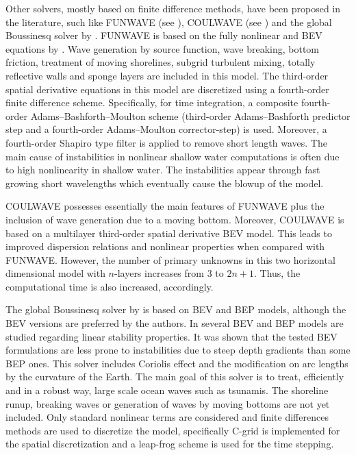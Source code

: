 Other solvers, mostly based on finite difference methods, have been
proposed in the literature, such like FUNWAVE (see \citet{Kirby1998}),
COULWAVE (see \citet{LynettLiu2004}) and the global Boussinesq solver
by \citet{PedersenLovholt2008}.  FUNWAVE is based on the fully
nonlinear and BEV equations by \citet{WeiKirby1995}.  Wave generation
by source function, wave breaking, bottom friction, treatment of
moving shorelines, subgrid turbulent mixing, totally reflective walls
and sponge layers are included in this model.  The third-order spatial
derivative equations in this model are discretized using a
fourth-order finite difference scheme.  Specifically, for time
integration, a composite fourth-order Adams--Bashforth--Moulton scheme
(third-order Adams--Bashforth predictor step and a fourth-order
Adams--Moulton corrector-step) is used.  Moreover, a fourth-order
Shapiro type filter is applied to remove short length waves.  The main
cause of instabilities in nonlinear shallow water computations is
often due to high nonlinearity in shallow water.  The instabilities
appear through fast growing short wavelengths which eventually cause
the blowup of the model.

COULWAVE possesses essentially the main features of FUNWAVE plus the
inclusion of wave generation due to a moving bottom.  Moreover,
COULWAVE is based on a multilayer third-order spatial derivative BEV
model.  This leads to improved dispersion relations and nonlinear
properties when compared with FUNWAVE.  However, the number of primary
unknowns in this two horizontal dimensional model with $n$-layers
increases from $3$ to $2n+1$. Thus, the computational time is also
increased, accordingly.

The global Boussinesq solver by \citet{PedersenLovholt2008} is based
on BEV and BEP models, although the BEV versions are preferred by the
authors.  In \citet{LovholtPedersen2009} several BEV and BEP models
are studied regarding linear stability properties.  It was shown that
the tested BEV formulations are less prone to instabilities due to
steep depth gradients than some BEP ones.  This solver includes
Coriolis effect and the modification on arc lengths by the curvature
of the Earth. The main goal of this solver is to treat, efficiently
and in a robust way, large scale ocean waves such as tsunamis.  The
shoreline runup, breaking waves or generation of waves by moving
bottoms are not yet included.  Only standard nonlinear terms are
considered and finite differences methods are used to discretize the
model, specifically C-grid is implemented for the spatial
discretization and a leap-frog scheme is used for the time stepping.

